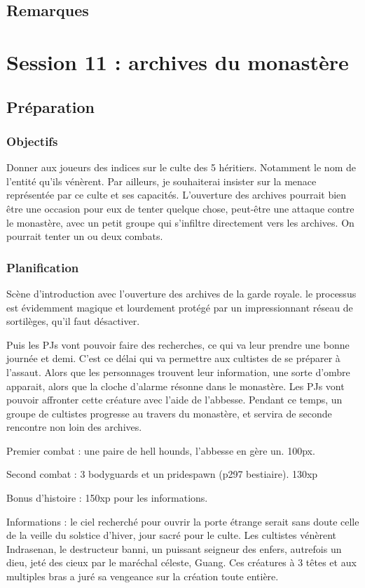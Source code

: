 \documentclass[10pt,a4paper]{book}
\begin{document}
\subsection{Remarques}
\section{Session 11 : archives du monastère}
\subsection{Préparation}
\subsubsection{Objectifs}
Donner aux joueurs des indices sur le culte des 5 héritiers. Notamment le nom de l'entité qu'ils vénèrent. Par ailleurs, je souhaiterai insister sur la menace représentée par ce culte et ses capacités. L'ouverture des archives pourrait bien être une occasion pour eux de tenter quelque chose, peut-être une attaque contre le monastère, avec un petit groupe qui s'infiltre directement vers les archives. On pourrait tenter un ou deux combats.
\subsubsection{Planification}
Scène d'introduction avec l'ouverture des archives de la garde royale. le processus est évidemment magique et lourdement protégé par un impressionnant réseau de sortilèges, qu'il faut désactiver. 

Puis les PJs vont pouvoir faire des recherches, ce  qui va leur prendre une bonne journée et demi. C'est ce délai qui va permettre aux cultistes de se préparer à l'assaut. Alors que les personnages trouvent leur information, une sorte d'ombre apparait, alors que la cloche d'alarme résonne dans le monastère. Les PJs vont pouvoir affronter cette créature avec l'aide de l'abbesse. Pendant ce temps, un groupe de cultistes progresse au travers du monastère, et servira de seconde rencontre non loin des archives.

Premier combat : une paire de hell hounds, l'abbesse en gère un. 100px.

Second combat : 3 bodyguards et un pridespawn (p297 bestiaire). 130xp

Bonus d'histoire : 150xp pour les informations.

Informations : le ciel recherché pour ouvrir la porte étrange serait sans doute celle de la veille du solstice d'hiver, jour sacré pour le culte. Les cultistes vénèrent Indrasenan, le destructeur banni, un puissant seigneur des enfers, autrefois un dieu, jeté des cieux par le maréchal céleste, Guang. Ces créatures à 3 têtes et aux multiples bras a juré sa vengeance sur la création toute entière.
\end{document}

